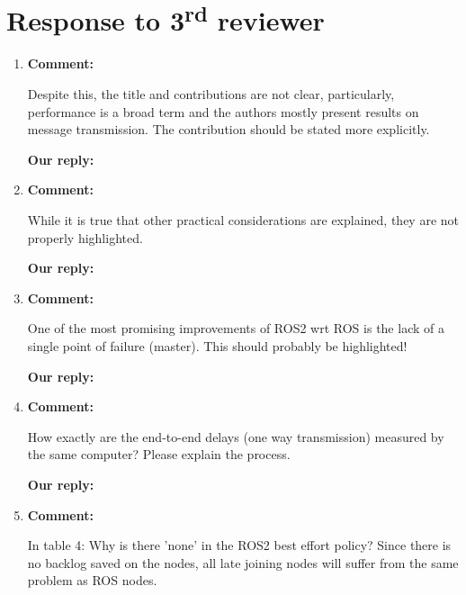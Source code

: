 \documentclass{article}
\newcommand\rd{\textsuperscript{rd}\xspace}
\begin{document}
\newpage


\section{Response to 3\rd reviewer}
\begin{enumerate}

\item \begin{flushleft}
  \textbf{Comment:}
\end{flushleft}
Despite this, the title and contributions are not clear, particularly, performance is a broad term and the authors mostly present results on message transmission. The contribution should be stated more explicitly.

\begin{flushleft}
  \textbf{Our reply:}
\end{flushleft}


\item \begin{flushleft}
  \textbf{Comment:}
\end{flushleft}
While it is true that other practical considerations are explained, they are not properly highlighted.

\begin{flushleft}
  \textbf{Our reply:}
\end{flushleft}


\item \begin{flushleft}
  \textbf{Comment:}
\end{flushleft}
One of the most promising improvements of ROS2 wrt ROS is the lack of a single point of failure (master). This should probably be highlighted!

\begin{flushleft}
  \textbf{Our reply:}
\end{flushleft}


\item \begin{flushleft}
  \textbf{Comment:}
\end{flushleft}
How exactly are the end-to-end delays (one way transmission) measured by the same computer? Please explain the process.

\begin{flushleft}
  \textbf{Our reply:}
\end{flushleft}


\item \begin{flushleft}
  \textbf{Comment:}
\end{flushleft}
In table 4: Why is there 'none' in the ROS2 best effort policy? Since there is no backlog saved on the nodes, all late joining nodes will suffer from the same problem as ROS nodes.


\end{enumerate}
\end{document}
